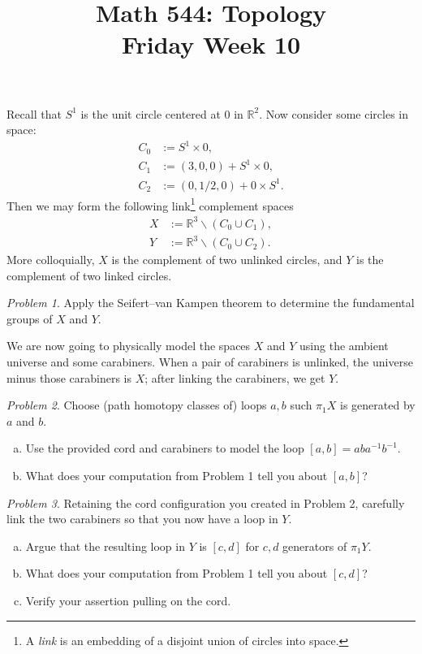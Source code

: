 \documentclass[11pt,twoside]{amsart}
\title{Math 544: Topology\\ Friday Week 10}
\theoremstyle{plain}
\theoremstyle{remark}
\newtheorem{prob}{Problem}
\theoremstyle{definition}
\theoremstyle{definition}
\newcommand{\RR}{\mathbb{R}}
\begin{document}
\maketitle

Recall that $S^1$ is the unit circle centered at $0$ in $\RR^2$. Now consider some circles in space:
\[
\begin{aligned}
  C_0 &:= S^1\times 0,\\
  C_1 &:= (3,0,0)+S^1\times 0,\\
  C_2 &:= (0,1/2,0)+0\times S^1.
\end{aligned}
\]
Then we may form the following link\footnote{A \emph{link} is an embedding of a disjoint union of circles into space.} complement spaces
\[
\begin{aligned}
  X &:= \RR^3\smallsetminus (C_0 \cup C_1),\\
  Y &:= \RR^3\smallsetminus (C_0 \cup C_2).
\end{aligned}
\]
More colloquially, $X$ is the complement of two unlinked circles, and $Y$ is the complement of two linked circles.

\begin{prob}
Apply the Seifert--van Kampen theorem to determine the fundamental groups of $X$ and $Y$.
\end{prob}

We are now going to physically model the spaces $X$ and $Y$ using the ambient universe and some carabiners. When a pair of carabiners is unlinked, the universe minus those carabiners is $X$; after linking the carabiners, we get $Y$.

\begin{prob}
Choose (path homotopy classes of) loops $a,b$ such $\pi_1X$ is generated by $a$ and $b$.
\begin{enumerate}[(a)]
\item Use the provided cord and carabiners to model the loop $[a,b]=aba^{-1}b^{-1}$.
\item What does your computation from Problem 1 tell you about $[a,b]$?
\end{enumerate}
\end{prob}

\begin{prob}
Retaining the cord configuration you created in Problem 2, carefully link the two carabiners so that you now have a loop in $Y$.
\begin{enumerate}[(a)]
\item Argue that the resulting loop in $Y$ is $[c,d]$ for $c,d$ generators of $\pi_1Y$.
\item What does your computation from Problem 1 tell you about $[c,d]$?
\item Verify your assertion pulling on the cord.
\end{enumerate}
\end{prob}
\end{document}
